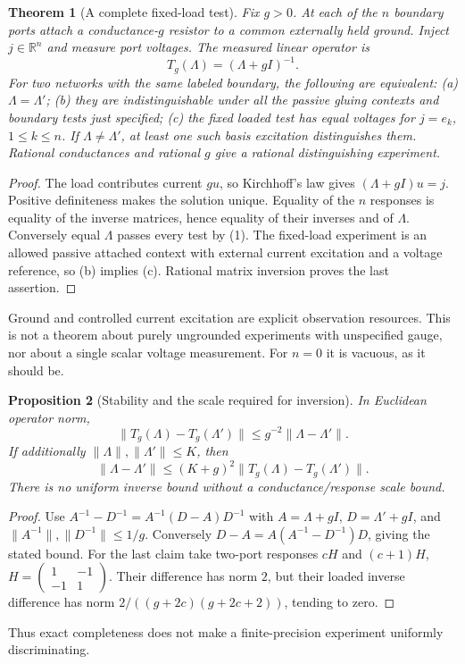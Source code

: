 \documentclass[11pt]{article}
\newtheorem{theorem}{Theorem}\newtheorem{proposition}[theorem]{Proposition}
\begin{document}
\begin{theorem}[A complete fixed-load test]
Fix $g>0$. At each of the $n$ boundary ports attach a conductance-$g$ resistor to a common externally held ground. Inject $j\in\mathbb R^n$ and measure port voltages. The measured linear operator is
\[T_g(\Lambda)=(\Lambda+gI)^{-1}.\]
For two networks with the same labeled boundary, the following are equivalent:
(a) $\Lambda=\Lambda'$;
(b) they are indistinguishable under all the passive gluing contexts and boundary tests just specified;
(c) the fixed loaded test has equal voltages for $j=e_k$, $1\leq k\leq n$.
If $\Lambda\ne\Lambda'$, at least one such basis excitation distinguishes them. Rational conductances and rational $g$ give a rational distinguishing experiment.
\end{theorem}
\begin{proof}
The load contributes current $gu$, so Kirchhoff's law gives $(\Lambda+gI)u=j$. Positive definiteness makes the solution unique. Equality of the $n$ responses is equality of the inverse matrices, hence equality of their inverses and of $\Lambda$. Conversely equal $\Lambda$ passes every test by (1). The fixed-load experiment is an allowed passive attached context with external current excitation and a voltage reference, so (b) implies (c). Rational matrix inversion proves the last assertion.
\end{proof}
Ground and controlled current excitation are explicit observation resources. This is not a theorem about purely ungrounded experiments with unspecified gauge, nor about a single scalar voltage measurement. For $n=0$ it is vacuous, as it should be.

\begin{proposition}[Stability and the scale required for inversion]
In Euclidean operator norm,
\[\|T_g(\Lambda)-T_g(\Lambda')\|\leq g^{-2}\|\Lambda-\Lambda'\|.\]
If additionally $\|\Lambda\|,\|\Lambda'\|\leq K$, then
\[\|\Lambda-\Lambda'\|\leq(K+g)^2\|T_g(\Lambda)-T_g(\Lambda')\|.\]
There is no uniform inverse bound without a conductance/response scale bound.
\end{proposition}
\begin{proof}
Use $A^{-1}-D^{-1}=A^{-1}(D-A)D^{-1}$ with $A=\Lambda+gI$, $D=\Lambda'+gI$, and $\|A^{-1}\|,\|D^{-1}\|\leq1/g$. Conversely $D-A=A(A^{-1}-D^{-1})D$, giving the stated bound. For the last claim take two-port responses $cH$ and $(c+1)H$, $H=\left(\begin{smallmatrix}1&-1\\-1&1\end{smallmatrix}\right)$. Their difference has norm $2$, but their loaded inverse difference has norm $2/((g+2c)(g+2c+2))$, tending to zero.
\end{proof}
Thus exact completeness does not make a finite-precision experiment uniformly discriminating.
\end{document}
